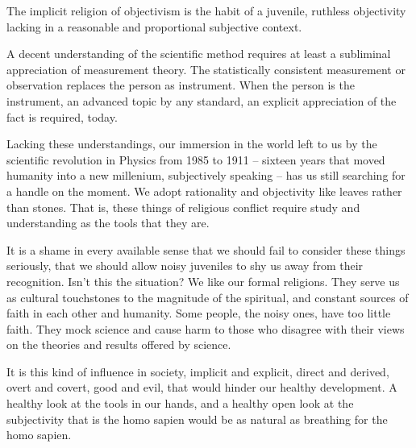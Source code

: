 

The implicit religion of objectivism is the habit of a juvenile,
ruthless objectivity lacking in a reasonable and proportional
subjective context.  

A decent understanding of the scientific method requires at least a
subliminal appreciation of measurement theory.  The statistically
consistent measurement or observation replaces the person as
instrument.  When the person is the instrument, an advanced topic by
any standard, an explicit appreciation of the fact is required, today.

Lacking these understandings, our immersion in the world left to us by
the scientific revolution in Physics from 1985 to 1911 -- sixteen
years that moved humanity into a new millenium, subjectively speaking
-- has us still searching for a handle on the moment.  We adopt
rationality and objectivity like leaves rather than stones.  That is,
these things of religious conflict require study and understanding as
the tools that they are.

It is a shame in every available sense that we should fail to consider
these things seriously, that we should allow noisy juveniles to shy us
away from their recognition.  Isn't this the situation?  We like our
formal religions.  They serve us as cultural touchstones to the
magnitude of the spiritual, and constant sources of faith in each
other and humanity.  Some people, the noisy ones, have too little
faith.  They mock science and cause harm to those who disagree with
their views on the theories and results offered by science.

It is this kind of influence in society, implicit and explicit, direct
and derived, overt and covert, good and evil, that would hinder our
healthy development.  A healthy look at the tools in our hands, and a
healthy open look at the subjectivity that is the homo sapien would be
as natural as breathing for the homo sapien.

\bye
